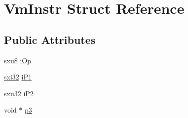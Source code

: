 \hypertarget{struct_vm_instr}{\section{Vm\-Instr Struct Reference}
\label{d1/dc1/struct_vm_instr}
}
\subsection*{Public Attributes}
\begin{DoxyCompactItemize}
\item 
\hyperlink{unqlite_8c_ad603950fcd99613e8ef4887422cde7a0}{sxu8} \hyperlink{struct_vm_instr_a07b706beee4bd8af1d91b015febc7dde}{i\-Op}
\item 
\hyperlink{unqlite_8c_a5a58035d4ae379178e2ca46cc3272fc5}{sxi32} \hyperlink{struct_vm_instr_a77c85ac2f3eed950457e7394560027ca}{i\-P1}
\item 
\hyperlink{unqlite_8c_abc5a8a3f345c200c98c485551f49666e}{sxu32} \hyperlink{struct_vm_instr_a6439f55a465ca1744a5c3176d81ff2fe}{i\-P2}
\item 
void $\ast$ \hyperlink{struct_vm_instr_aac547d9de597b591c9b3e97b4bd8fa4d}{p3}
\end{DoxyCompactItemize}



